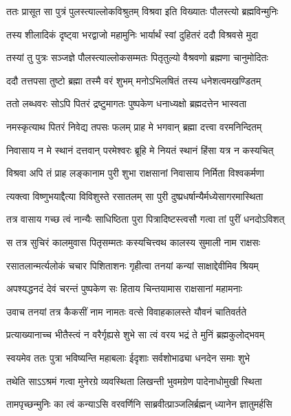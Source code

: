 \twolineshloka
{ततः प्रासूत सा पुत्रं पुलस्त्याल्लोकविश्रुतम्}
{विश्रवा इति विख्यातः पौलस्त्यो ब्रह्मविन्मुनिः} %

\twolineshloka
{तस्य शीलादिकं दृष्ट्वा भरद्वाजो महामुनिः}
{भार्यार्थं स्वां दुहितरं ददौ विश्रवसे मुदा} %

\twolineshloka
{तस्यां तु पुत्रः सञ्जज्ञे पौलस्त्याल्लोकसम्मतः}
{पितृतुल्यो वैश्रवणो ब्रह्मणा चानुमोदितः} %

\twolineshloka
{ददौ तत्तपसा तुष्टो ब्रह्मा तस्मै वरं शुभम्}
{मनोऽभिलषितं तस्य धनेशत्वमखण्डितम्} %

\twolineshloka
{ततो लब्धवरः सोऽपि पितरं द्रष्टुमागतः}
{पुष्पकेण धनाध्यक्षो ब्रह्मदत्तेन भास्वता} %

\twolineshloka
{नमस्कृत्याथ पितरं निवेद्य तपसः फलम्}
{प्राह मे भगवान् ब्रह्मा दत्त्वा वरमनिन्दितम्} %

\twolineshloka
{निवासाय न मे स्थानं दत्तवान् परमेश्वरः}
{ब्रूहि मे नियतं स्थानं हिंसा यत्र न कस्यचित्} %

\twolineshloka
{विश्रवा अपि तं प्राह लङ्कानाम पुरी शुभा}
{राक्षसानां निवासाय निर्मिता विश्वकर्मणा} %

\twolineshloka
{त्यक्त्वा विष्णुभयाद्दैत्या विविशुस्ते रसातलम्}
{सा पुरी दुष्प्रधर्षान्यैर्मध्येसागरमास्थिता} %

\twolineshloka
{तत्र वासाय गच्छ त्वं नान्यैः साधिष्ठिता पुरा}
{पित्रादिष्टस्त्वसौ गत्वा तां पुरीं धनदोऽविशत्} %

\twolineshloka
{स तत्र सुचिरं कालमुवास पितृसम्मतः}
{कस्यचित्त्वथ कालस्य सुमाली नाम राक्षसः} %

\twolineshloka
{रसातलान्मर्त्यलोकं चचार पिशिताशनः}
{गृहीत्वा तनयां कन्यां साक्षाद्देवीमिव श्रियम्} %

\twolineshloka
{अपश्यद्धनदं देवं चरन्तं पुष्पकेण सः}
{हिताय चिन्तयामास राक्षसानां महामनाः} %

\twolineshloka
{उवाच तनयां तत्र कैकसीं नाम नामतः}
{वत्से विवाहकालस्ते यौवनं चातिवर्तते} %

\twolineshloka
{प्रत्याख्यानाच्च भीतैस्त्वं न वरैर्गृह्यसे शुभे}
{सा त्वं वरय भद्रं ते मुनिं ब्रह्मकुलोद्भवम्} %

\twolineshloka
{स्वयमेव ततः पुत्रा भविष्यन्ति महाबलाः}
{ईदृशाः सर्वशोभाढ्या धनदेन समाः शुभे} %

\twolineshloka
{तथेति साऽऽश्रमं गत्वा मुनेरग्रे व्यवस्थिता}
{लिखन्ती भुवमग्रेण पादेनाधोमुखी स्थिता} %

\twolineshloka
{तामपृच्छन्मुनिः का त्वं कन्याऽसि वरवर्णिनि}
{साब्रवीत्प्राञ्जलिर्ब्रह्मन् ध्यानेन ज्ञातुमर्हसि} %

